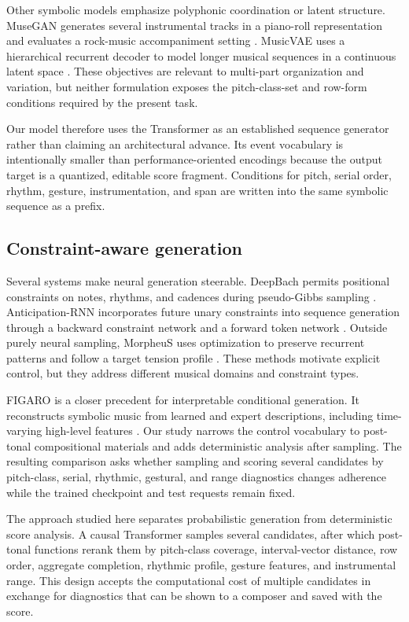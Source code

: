 Other symbolic models emphasize polyphonic coordination or latent structure. MuseGAN generates several instrumental tracks in a piano-roll representation and evaluates a rock-music accompaniment setting \citep{dong2018musegan}. MusicVAE uses a hierarchical recurrent decoder to model longer musical sequences in a continuous latent space \citep{roberts2018hierarchical}. These objectives are relevant to multi-part organization and variation, but neither formulation exposes the pitch-class-set and row-form conditions required by the present task.

Our model therefore uses the Transformer as an established sequence generator rather than claiming an architectural advance. Its event vocabulary is intentionally smaller than performance-oriented encodings because the output target is a quantized, editable score fragment. Conditions for pitch, serial order, rhythm, gesture, instrumentation, and span are written into the same symbolic sequence as a prefix.

\subsection{Constraint-aware generation}

Several systems make neural generation steerable. DeepBach permits positional constraints on notes, rhythms, and cadences during pseudo-Gibbs sampling \citep{hadjeres2017deepbach}. Anticipation-RNN incorporates future unary constraints into sequence generation through a backward constraint network and a forward token network \citep{hadjeres2020anticipation}. Outside purely neural sampling, MorpheuS uses optimization to preserve recurrent patterns and follow a target tension profile \citep{herremans2019morpheus}. These methods motivate explicit control, but they address different musical domains and constraint types.

FIGARO is a closer precedent for interpretable conditional generation. It reconstructs symbolic music from learned and expert descriptions, including time-varying high-level features \citep{vonrutte2023figaro}. Our study narrows the control vocabulary to post-tonal compositional materials and adds deterministic analysis after sampling. The resulting comparison asks whether sampling and scoring several candidates by pitch-class, serial, rhythmic, gestural, and range diagnostics changes adherence while the trained checkpoint and test requests remain fixed.

The approach studied here separates probabilistic generation from deterministic score analysis. A causal Transformer samples several candidates, after which post-tonal functions rerank them by pitch-class coverage, interval-vector distance, row order, aggregate completion, rhythmic profile, gesture features, and instrumental range. This design accepts the computational cost of multiple candidates in exchange for diagnostics that can be shown to a composer and saved with the score.

